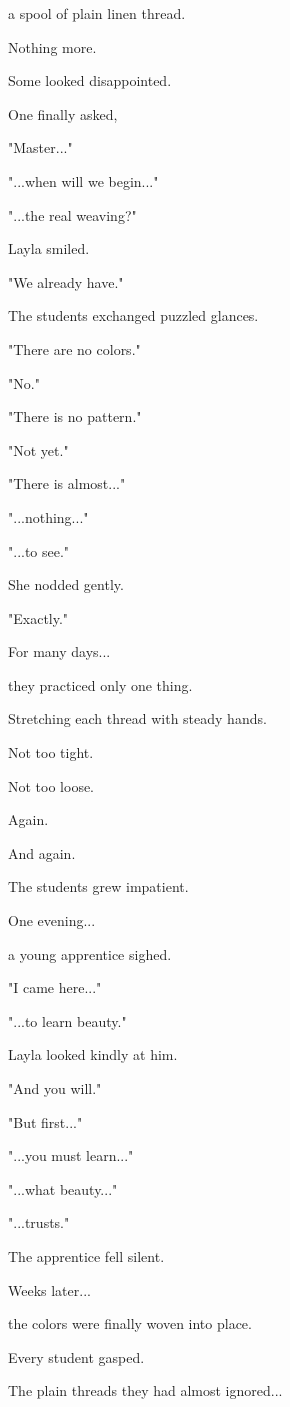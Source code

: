 \documentclass[12pt,openany]{book}
\begin{document}
a spool of plain linen thread.

Nothing more.

Some looked disappointed.

One finally asked,

"Master..."

"...when will we begin..."

"...the real weaving?"

Layla smiled.

"We already have."

The students exchanged puzzled glances.

"There are no colors."

"No."

"There is no pattern."

"Not yet."

"There is almost..."

"...nothing..."

"...to see."

She nodded gently.

"Exactly."

For many days...

they practiced only one thing.

Stretching each thread with steady hands.

Not too tight.

Not too loose.

Again.

And again.

The students grew impatient.

One evening...

a young apprentice sighed.

"I came here..."

"...to learn beauty."

Layla looked kindly at him.

"And you will."

"But first..."

"...you must learn..."

"...what beauty..."

"...trusts."

The apprentice fell silent.

Weeks later...

the colors were finally woven into place.

Every student gasped.

The plain threads they had almost ignored...
\end{document}
